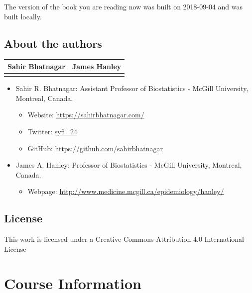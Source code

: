 \documentclass[]{book}
\providecommand{\tightlist}{%
  \setlength{\itemsep}{0pt}\setlength{\parskip}{0pt}}
\providecommand{\tightlist}{%
  \setlength{\itemsep}{0pt}\setlength{\parskip}{0pt}}
\begin{document}
The version of the book you are reading now was built on 2018-09-04 and
was built locally.

\section*{About the authors}\label{about-the-authors}

\begin{longtable}[]{@{}cc@{}}
\toprule
Sahir Bhatnagar & James Hanley\tabularnewline
\midrule
\endhead
&\tabularnewline
\bottomrule
\end{longtable}

\begin{itemize}
\tightlist
\item
  Sahir R. Bhatnagar: Assistant Professor of Biostatistics - McGill
  University, Montreal, Canada.

  \begin{itemize}
  \tightlist
  \item
    Website: \url{https://sahirbhatnagar.com/}\\
  \item
    Twitter: \href{https://twitter.com/syfi_24}{syfi\_24}\\
  \item
    GitHub: \url{https://github.com/sahirbhatnagar}\\
  \end{itemize}
\item
  James A. Hanley: Professor of Biostatistics - McGill University,
  Montreal, Canada.

  \begin{itemize}
  \tightlist
  \item
    Webpage: \url{http://www.medicine.mcgill.ca/epidemiology/hanley/}
  \end{itemize}
\end{itemize}

\section*{License}\label{license}

This work is licensed under a Creative Commons Attribution 4.0
International License

\chapter*{Course Information}\label{course-information}
\end{document}
